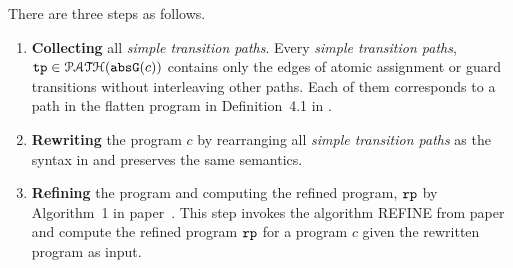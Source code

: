 There are three steps as follows.
\begin{enumerate}
  \item \textbf{Collecting} all \emph{simple transition paths}.
  Every \emph{simple transition paths}, $\mathtt{tp} \in \mathcal{PATH}(\mathtt{abs}{\mathtt{G}}(c))$ 
  contains only the edges of atomic assignment or guard transitions without interleaving other paths.
  Each of them corresponds to a path in the flatten program in Definition~4.1 in \cite{GulwaniJK09}.
  \item \textbf{Rewriting} the program $c$ by rearranging all \emph{simple transition paths} as the syntax in \cite{GulwaniJK09} and preserves the same semantics.
  \item \textbf{Refining} the program and computing the 
  refined program, $\mathtt{rp}$ by Algorithm~1 in paper~\cite{GulwaniJK09}.
  This step invokes the algorithm REFINE from paper~\cite{GulwaniJK09} and compute the 
  refined program $\mathtt{rp}$ for a program $c$ given the rewritten program as input.
\end{enumerate}

